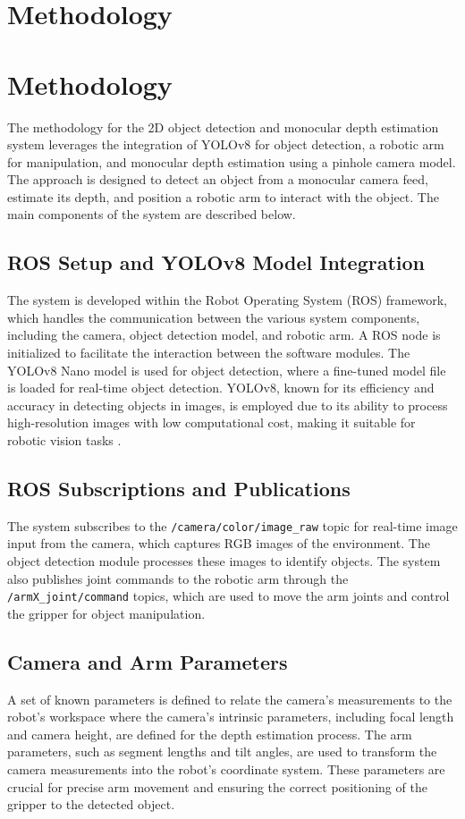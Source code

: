 \section{Methodology}

\section{Methodology}

The methodology for the 2D object detection and monocular depth estimation system leverages the integration of YOLOv8 for object detection, a robotic arm for manipulation, and monocular depth estimation using a pinhole camera model. The approach is designed to detect an object from a monocular camera feed, estimate its depth, and position a robotic arm to interact with the object. The main components of the system are described below.

\subsection{ROS Setup and YOLOv8 Model Integration}
The system is developed within the Robot Operating System (ROS) framework, which handles the communication between the various system components, including the camera, object detection model, and robotic arm. A ROS node is initialized to facilitate the interaction between the software modules. The YOLOv8 Nano model is used for object detection, where a fine-tuned model file is loaded for real-time object detection. YOLOv8, known for its efficiency and accuracy in detecting objects in images, is employed due to its ability to process high-resolution images with low computational cost, making it suitable for robotic vision tasks \cite{redmon2016you}.

\subsection{ROS Subscriptions and Publications}
The system subscribes to the \texttt{/camera/color/image\_raw} topic for real-time image input from the camera, which captures RGB images of the environment. The object detection module processes these images to identify objects. The system also publishes joint commands to the robotic arm through the \texttt{/armX\_joint/command} topics, which are used to move the arm joints and control the gripper for object manipulation.

\subsection{Camera and Arm Parameters}
A set of known parameters is defined to relate the camera's measurements to the robot’s workspace where the camera’s intrinsic parameters, including focal length and camera height, are defined for the depth estimation process. The arm parameters, such as segment lengths and tilt angles, are used to transform the camera measurements into the robot's coordinate system. These parameters are crucial for precise arm movement and ensuring the correct positioning of the gripper to the detected object.

